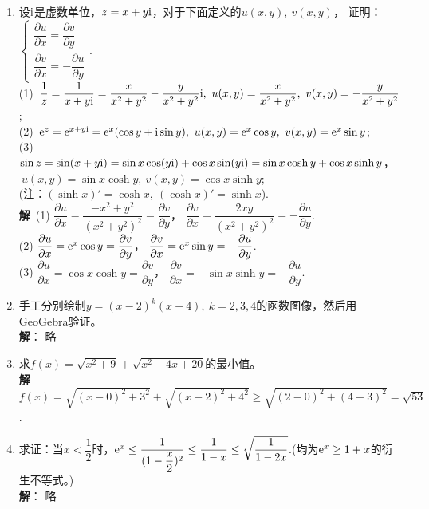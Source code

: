\begin{enumerate}[label={\textbf{\arabic*.}},leftmargin=
    \inteval{\myenumleftmargin}pt]
\item 设$ \mathrm{i} $是虚数单位，$ z=x+ y\mathrm{i} $，对于下面定义的$ u(x,y),\ v(x,y) $，
证明：$ \begin{cases}
    \dfrac{\partial u}{\partial x} =\dfrac{\partial v}{\partial y} \\
    \dfrac{\partial v}{\partial x} =-\dfrac{\partial u}{\partial y} 
\end{cases} $. \\
(1)\ $ \dfrac{1}{z}=\dfrac{1}{x+y\mathrm{i}}=\dfrac{x}{x^2+y^2}-\dfrac{y}{x^2+y^2}\mathrm{i},
\ u(x,y)=\dfrac{x}{x^2+y^2},\ v(x,y)=-\dfrac{y}{x^2+y^2} $; \\
(2)\ $ \e^{z}=\e^{x+y\i}=\e^x(\cos y+\i\sin y),\ u(x,y)=\e^x \cos y,
\ v(x,y)=\e^x\sin y $; \\
(3)\ $ \sin z=\sin(x+y\mathrm{i})=\sin x\cos(y\mathrm{i})+\cos x\sin(y\mathrm{i})=\sin x\cosh y+
\cos x\sinh y $， \\ $\ u(x,y)=\sin x\cosh y,\ v(x,y)=\cos x\sinh y $; \\
(注：$ (\sinh x)'=\cosh x,\ (\cosh x)'=\sinh x $). \\
\textbf{解}\ (1) $ \dfrac{\partial u}{\partial x} =
\dfrac{-x^2+y^2}{(x^2+y^2)^2}=\dfrac{\partial v}{\partial y} $，
$ \dfrac{\partial v}{\partial x} =\dfrac{2xy}{(x^2+y^2)^2}=
-\dfrac{\partial u}{\partial y} $. \\
(2) $ \dfrac{\partial u}{\partial x} =\mathrm{e}^x \cos y=
\dfrac{\partial v}{\partial y} $，
$ \dfrac{\partial v}{\partial x} =\mathrm{e}^x \sin y=
-\dfrac{\partial u}{\partial y} $. \\
(3) $ \dfrac{\partial u}{\partial x} =\cos x\cosh y=
\dfrac{\partial v}{\partial y} $，
$ \dfrac{\partial v}{\partial x} = -\sin x\sinh y=
-\dfrac{\partial u}{\partial y} $. 

 
\item 手工分别绘制$ y=(x-2)^k(x-4),\ k=2,3,4 $的函数图像，然后用GeoGebra验证。
\ifteach \\ \textbf{解}：
略
\fi

\item 求$ f(x)=\sqrt{x^2+9}+\sqrt{x^2-4x+20} $的最小值。
\ifteach \\
\textbf{解}\ $ f(x)=\sqrt{(x-0)^2+3^2}+\sqrt{(x-2)^2+4^2}\geq 
\sqrt{(2-0)^2+(4+3)^2} =\sqrt{53} $.
\fi

\item 求证：当$ x<\dfrac{1}{2} $时，$ \mathrm{e}^x\leq \dfrac{1}{(1-\dfrac{x}{2})^2}
\leq \dfrac{1}{1-x}\leq \sqrt{\dfrac{1}{1-2x}} $.(均为$ \mathrm{e}^x\geq 1+x $的衍生不等式。)
\ifteach \\ \textbf{解}：
略
\fi


\end{enumerate}
